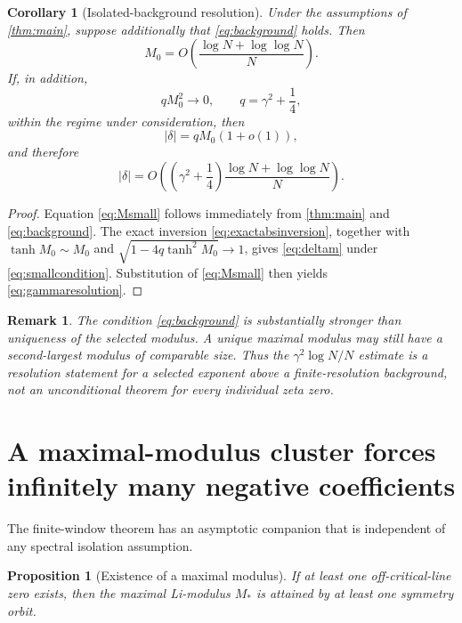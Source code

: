 \documentclass[11pt]{article}
\newtheorem{proposition}[theorem]{Proposition}
\newtheorem{corollary}[theorem]{Corollary}
\newtheorem{remark}[theorem]{Remark}
\begin{document}
\begin{corollary}[Isolated-background resolution]
Under the assumptions of \cref{thm:main}, suppose additionally that \eqref{eq:background} holds. Then
\begin{equation}
M_0
=O\left(\frac{\log N+\log\log N}{N}\right).
\label{eq:Msmall}
\end{equation}
If, in addition,
\begin{equation}
qM_0^2\to0,
\qquad q=\gamma^2+\frac14,
\label{eq:smallcondition}
\end{equation}
within the regime under consideration, then
\begin{equation}
|\delta|
=qM_0(1+o(1)),
\label{eq:deltam}
\end{equation}
and therefore
\begin{equation}
|\delta|
=O\!\left(
\left(\gamma^2+\frac14\right)
\frac{\log N+\log\log N}{N}
\right).
\label{eq:gammaresolution}
\end{equation}
\end{corollary}

\begin{proof}
Equation \eqref{eq:Msmall} follows immediately from \cref{thm:main} and \eqref{eq:background}. The exact inversion \eqref{eq:exactabsinversion}, together with \(\tanh M_0\sim M_0\) and \(\sqrt{1-4q\tanh^2M_0}\to1\), gives \eqref{eq:deltam} under \eqref{eq:smallcondition}. Substitution of \eqref{eq:Msmall} then yields \eqref{eq:gammaresolution}.
\end{proof}

\begin{remark}
The condition \eqref{eq:background} is substantially stronger than uniqueness of the selected modulus. A unique maximal modulus may still have a second-largest modulus of comparable size. Thus the \(\gamma^2\log N/N\) estimate is a resolution statement for a selected exponent above a finite-resolution background, not an unconditional theorem for every individual zeta zero.
\end{remark}

\section{A maximal-modulus cluster forces infinitely many negative coefficients}

The finite-window theorem has an asymptotic companion that is independent of any spectral isolation assumption.

\begin{proposition}[Existence of a maximal modulus]
If at least one off-critical-line zero exists, then the maximal Li-modulus \(M_*\) is attained by at least one symmetry orbit.
\end{proposition}
\end{document}
